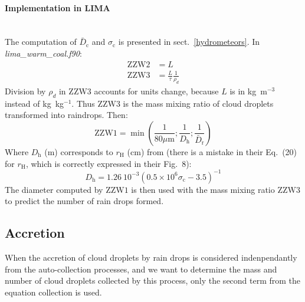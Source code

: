 \paragraph{Implementation in LIMA}
~\\
The computation of $\bar{D}_{\mathrm{c}}$ and $\sigma_{\mathrm{c}}$ is presented in sect.\ \ref{hydrometeors}. In \emph{lima\_warm\_coal.f90}:
\begin{align}
\mathrm{ZZW2} &= L \\
\mathrm{ZZW3} &= \frac{L}{\tau} \frac{1}{\rho_d}
\end{align}
Division by $\rho_d$ in $\mathrm{ZZW3}$ accounts for units change, because $L$ is in kg~m$^{-3}$ instead of kg~kg$^{-1}$. Thus $\mathrm{ZZW3}$ is the mass mixing ratio of cloud droplets transformed into raindrops. Then:
\begin{equation}
\mathrm{ZZW1} = \min \left( \frac{1}{80 \mu\text{m}} ; \frac{1}{D_{\mathrm{h}}} ; \frac{1}{\bar{D}_{\mathrm{r}}} \right)
\end{equation}
Where $D_{\mathrm{h}}$ (m) corresponds to $r_{\mathrm{H}}$ (cm) from \citet{Berry1974} (there is a mistake in their Eq.~(20) for $r_{\mathrm{H}}$, which is correctly expressed in their Fig.~8):
\begin{equation}
D_{\mathrm{h}} = 1.26~10^{-3} \left( 0.5 \times 10^6 \sigma_{\mathrm{c}} - 3.5 \right)^{-1}
\end{equation}
The diameter computed by $\mathrm{ZZW1}$ is then used with the mass mixing ratio $\mathrm{ZZW3}$ to predict the number of rain drops formed.

\subsection{Accretion}

When the accretion of cloud droplets by rain drops is considered indenpendantly from the auto-collection processes, and we want to determine the mass and number of cloud droplets collected by this process, only the second term from the equation collection is used.


